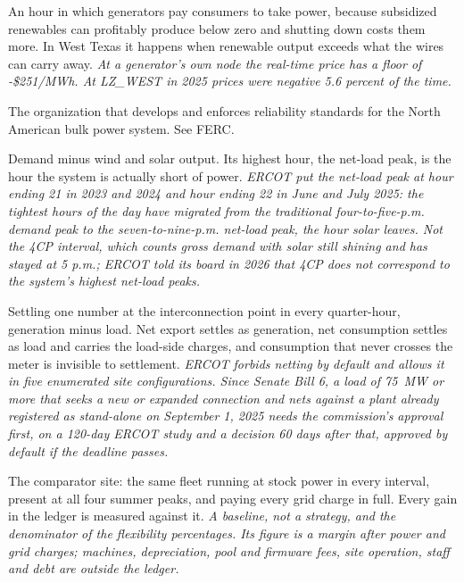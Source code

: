 \begin{description}[leftmargin=0pt,style=unboxed,itemsep=0.35em,parsep=0.15em]
\item[negative price] \hypertarget{glossary:negative-price}{}An hour in which generators pay consumers to take power, because subsidized renewables can profitably produce below zero and shutting down costs them more. In West Texas it happens when renewable output exceeds what the wires can carry away. \emph{At a generator's own node the real-time price has a floor of -\$251/MWh. At LZ\_WEST in 2025 prices were negative 5.6 percent of the time.}
\begin{samepage}
\item[NERC (North American Electric Reliability Corporation)] \hypertarget{glossary:nerc}{}The organization that develops and enforces reliability standards for the North American bulk power system. See FERC.\par
\end{samepage}
\item[net load] \hypertarget{glossary:net-load}{}Demand minus wind and solar output. Its highest hour, the net-load peak, is the hour the system is actually short of power. \emph{ERCOT put the net-load peak at hour ending 21 in 2023 and 2024 and hour ending 22 in June and July 2025: the tightest hours of the day have migrated from the traditional four-to-five-p.m. demand peak to the seven-to-nine-p.m. net-load peak, the hour solar leaves. Not the 4CP interval, which counts gross demand with solar still shining and has stayed at 5 p.m.; ERCOT told its board in 2026 that 4CP does not correspond to the system's highest net-load peaks.}
\item[netting] \hypertarget{glossary:netting}{}Settling one number at the interconnection point in every quarter-hour, generation minus load. Net export settles as generation, net consumption settles as load and carries the load-side charges, and consumption that never crosses the meter is invisible to settlement. \emph{ERCOT forbids netting by default and allows it in five enumerated site configurations. Since Senate Bill 6, a load of 75~MW or more that seeks a new or expanded connection and nets against a plant already registered as stand-alone on September 1, 2025 needs the commission's approval first, on a 120-day ERCOT study and a decision 60 days after that, approved by default if the deadline passes.}
\item[never-pausing site] \hypertarget{glossary:never-pausing-site}{}The comparator site: the same fleet running at stock power in every interval, present at all four summer peaks, and paying every grid charge in full. Every gain in the ledger is measured against it. \emph{A baseline, not a strategy, and the denominator of the flexibility percentages. Its figure is a margin after power and grid charges; machines, depreciation, pool and firmware fees, site operation, staff and debt are outside the ledger.}

\end{description}
